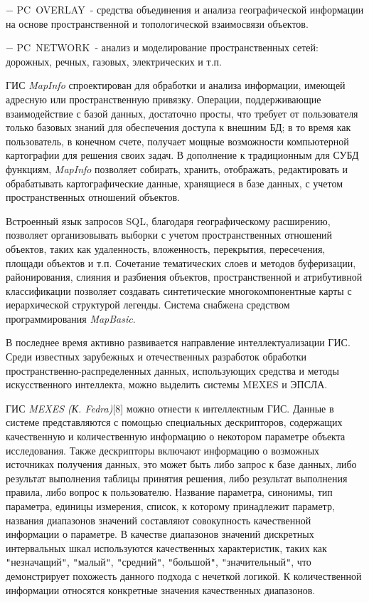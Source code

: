 \documentclass{article}
\begin{document}
\ensuremath{-} PC~OVERLAY~- средства объединения и анализа 
географической информации на основе пространственной 
и топологической взаимосвязи объектов. 

\ensuremath{-} PC~NETWORK~- анализ и моделирование пространственных 
сетей: дорожных, речных, газовых, электрических 
и т.п.

ГИС \textit{MapInfo }спроектирован для обработки и 
анализа информации, имеющей адресную или пространственную 
привязку. Операции, поддерживающие взаимодействие 
с базой данных, достаточно просты, что  требует 
от пользователя только базовых знаний для обеспечения 
доступа к внешним БД; в то время как пользователь, 
в конечном счете, получает мощные возможности 
компьютерной картографии для решения своих 
задач. В дополнение к традиционным для СУБД 
функциям, \textit{MapInfo} позволяет собирать, хранить, 
отображать, редактировать и обрабатывать картографические 
данные, хранящиеся в базе данных, с учетом пространственных 
отношений объектов.

Встроенный язык запросов SQL, благодаря географическому 
расширению, позволяет организовывать выборки 
с учетом пространственных отношений объектов, 
таких как удаленность, вложенность, перекрытия, 
пересечения, площади объектов и т.п. Сочетание 
тематических слоев и методов буферизации, районирования, 
слияния и разбиения объектов, пространственной 
и атрибутивной классификации позволяет создавать 
синтетические многокомпонентные карты с иерархической 
структурой легенды. Система снабжена средством 
программирования \textit{MapBasic}.

В последнее время активно развивается направление 
интеллектуализации ГИС. Среди известных зарубежных 
и отечественных разработок обработки пространственно-распределенных 
данных, использующих средства и методы искусственного 
интеллекта,  можно выделить системы MEXES и ЭПСЛА.

ГИС \textit{MEXES (К. Fedra)}[8] можно отнести к интеллектным 
ГИС. Данные в системе представляются с помощью 
специальных дескрипторов, содержащих качественную 
и количественную информацию о некотором параметре 
объекта исследования. Также дескрипторы включают 
информацию о возможных источниках получения 
данных, это может быть либо запрос к базе данных, 
либо результат выполнения таблицы принятия 
решения, либо результат выполнения правила, 
либо вопрос к пользователю. Название параметра, 
синонимы, тип параметра, единицы измерения, 
список, к которому принадлежит параметр, названия 
диапазонов значений составляют совокупность 
качественной информации о параметре. В качестве 
диапазонов значений дискретных интервальных 
шкал используются качественных характеристик, 
таких как \texttt{"}незначащий\texttt{"}, \texttt{"}малый\texttt{"}, 
\texttt{"}средний\texttt{"}, \texttt{"}большой\texttt{"}, \texttt{"}значительный\texttt{"}, 
что демонстрирует похожесть данного подхода 
с нечеткой логикой. К количественной информации 
относятся конкретные значения качественных 
диапазонов.
\end{document}
